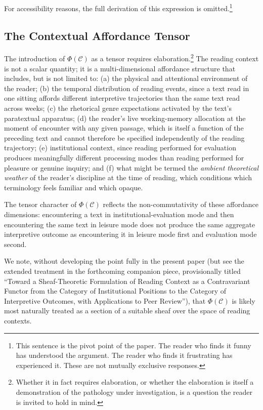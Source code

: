 \documentclass[12pt, a4paper]{article}
\begin{document}
For accessibility reasons, the full derivation of this expression is omitted.\footnote{This sentence is the pivot point of the paper. The reader who finds it funny has understood the argument. The reader who finds it frustrating has experienced it. These are not mutually exclusive responses.}

\subsection{The Contextual Affordance Tensor}

The introduction of $\Phi(\mathcal{C})$ as a tensor requires elaboration.\footnote{Whether it in fact requires elaboration, or whether the elaboration is itself a demonstration of the pathology under investigation, is a question the reader is invited to hold in mind.} The reading context is not a scalar quantity; it is a multi-dimensional affordance structure that includes, but is not limited to: (a) the physical and attentional environment of the reader; (b) the temporal distribution of reading events, since a text read in one sitting affords different interpretive trajectories than the same text read across weeks; (c) the rhetorical genre expectations activated by the text's paratextual apparatus; (d) the reader's live working-memory allocation at the moment of encounter with any given passage, which is itself a function of the preceding text and cannot therefore be specified independently of the reading trajectory; (e) institutional context, since reading performed for evaluation produces meaningfully different processing modes than reading performed for pleasure or genuine inquiry; and (f) what might be termed the \textit{ambient theoretical weather} of the reader's discipline at the time of reading, which conditions which terminology feels familiar and which opaque.

The tensor character of $\Phi(\mathcal{C})$ reflects the non-commutativity of these affordance dimensions: encountering a text in institutional-evaluation mode and then encountering the same text in leisure mode does not produce the same aggregate interpretive outcome as encountering it in leisure mode first and evaluation mode second.

We note, without developing the point fully in the present paper (but see the extended treatment in the forthcoming companion piece, provisionally titled ``Toward a Sheaf-Theoretic Formulation of Reading Context as a Contravariant Functor from the Category of Institutional Positions to the Category of Interpretive Outcomes, with Applications to Peer Review''), that $\Phi(\mathcal{C})$ is likely most naturally treated as a section of a suitable sheaf over the space of reading contexts.
\end{document}
